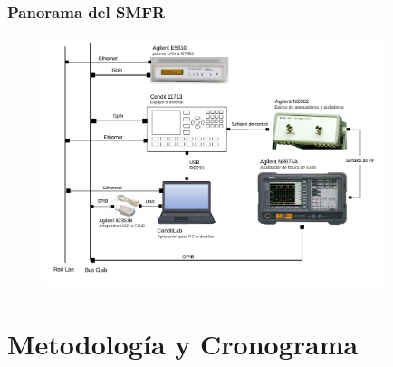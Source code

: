\documentclass[xcolor=pdftext, table]{beamer}
\begin{document}
	\begin{frame}
		\frametitle{Panorama del SMFR}			
	
		\begin{figure}
			\begin{center}
				\includegraphics[width=10cm]{Imagenes/DiagramaBloquesSistema.pdf}
			\end{center}
		\end{figure}	
	
	\end{frame}

	\section{Metodología y Cronograma}
	
\end{document}
